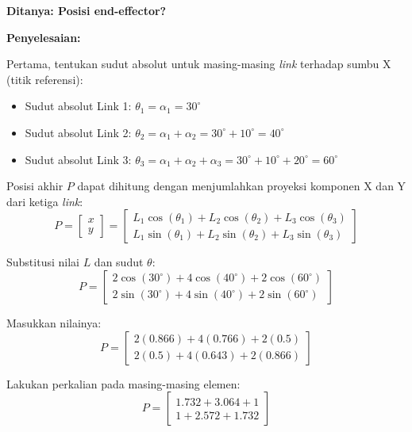 \documentclass[12pt, a4paper, bahasa]{article}
\begin{document}
\noindent \textbf{Ditanya: Posisi end-effector?}
\vspace{0.5cm}

\noindent \textbf{Penyelesaian:}

Pertama, tentukan sudut absolut untuk masing-masing \textit{link} terhadap sumbu X (titik referensi):
\begin{itemize}
    \item Sudut absolut Link 1: $\theta_1 = \alpha_1 = 30^\circ$
    \item Sudut absolut Link 2: $\theta_2 = \alpha_1 + \alpha_2 = 30^\circ + 10^\circ = 40^\circ$
    \item Sudut absolut Link 3: $\theta_3 = \alpha_1 + \alpha_2 + \alpha_3 = 30^\circ + 10^\circ + 20^\circ = 60^\circ$
\end{itemize}

Posisi akhir $P$ dapat dihitung dengan menjumlahkan proyeksi komponen X dan Y dari ketiga \textit{link}:
\begin{equation}
P = \begin{bmatrix} x \\ y \end{bmatrix} = 
\begin{bmatrix} 
L_1 \cos(\theta_1) + L_2 \cos(\theta_2) + L_3 \cos(\theta_3) \\ 
L_1 \sin(\theta_1) + L_2 \sin(\theta_2) + L_3 \sin(\theta_3) 
\end{bmatrix}
\end{equation}

Substitusi nilai $L$ dan sudut $\theta$:
\begin{equation}
P = \begin{bmatrix} 
2 \cos(30^\circ) + 4 \cos(40^\circ) + 2 \cos(60^\circ) \\ 
2 \sin(30^\circ) + 4 \sin(40^\circ) + 2 \sin(60^\circ) 
\end{bmatrix}
\end{equation}

Masukkan nilainya:
\begin{equation}
P = \begin{bmatrix} 
2(0.866) + 4(0.766) + 2(0.5) \\ 
2(0.5) + 4(0.643) + 2(0.866) 
\end{bmatrix}
\end{equation}

Lakukan perkalian pada masing-masing elemen:
\begin{equation}
P = \begin{bmatrix} 
1.732 + 3.064 + 1 \\ 
1 + 2.572 + 1.732 
\end{bmatrix}
\end{equation}
\end{document}
